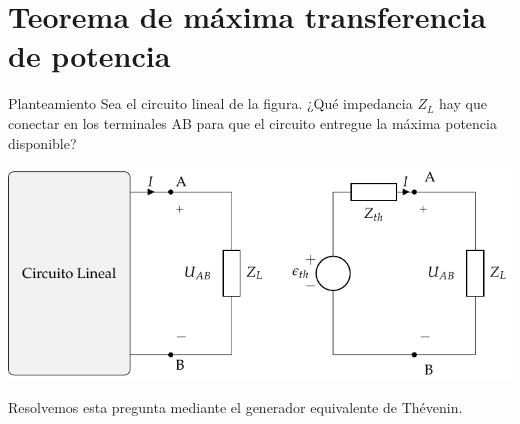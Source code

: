 \documentclass[xcolor={usenames,svgnames,dvipsnames}]{beamer}
\begin{document}
\section{Teorema de máxima transferencia de potencia}
\label{sec:org5ef688d}

\begin{frame}[label={sec:org809ea55}]{Planteamiento}
Sea el circuito lineal de la figura. ¿Qué impedancia \(Z_L\) hay que conectar en los terminales AB para que el circuito entregue la máxima potencia disponible?

\begin{center}
\includegraphics[width=.9\linewidth]{figs/EquivalenteThevenin.pdf}
\end{center}

Resolvemos esta pregunta mediante el generador equivalente de Thévenin.
\end{frame}
\end{document}
